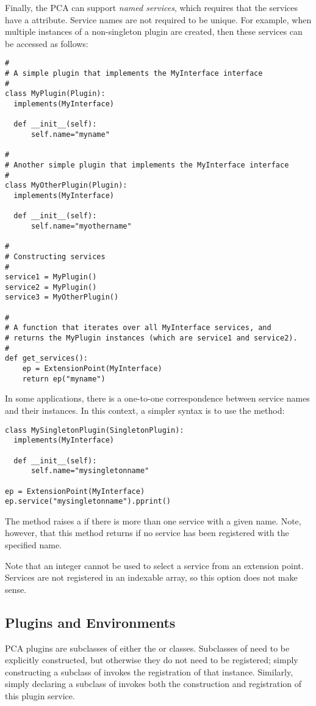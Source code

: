 Finally, the PCA can support \textit{named services}, which requires that
the services have a  attribute. Service names are not required
to be unique. For example, when multiple instances of a non-singleton
plugin are created, then these services can be accessed as follows:
\begin{lstlisting}
#
# A simple plugin that implements the MyInterface interface
#
class MyPlugin(Plugin):
  implements(MyInterface)

  def __init__(self):
      self.name="myname"

#
# Another simple plugin that implements the MyInterface interface
#
class MyOtherPlugin(Plugin):
  implements(MyInterface)

  def __init__(self):
      self.name="myothername"

#
# Constructing services
#
service1 = MyPlugin()
service2 = MyPlugin()
service3 = MyOtherPlugin()

#
# A function that iterates over all MyInterface services, and
# returns the MyPlugin instances (which are service1 and service2).
#
def get_services():
    ep = ExtensionPoint(MyInterface)
    return ep("myname")
\end{lstlisting}
In some applications, there is a one-to-one correspondence between service
names and their instances. In this context, a simpler syntax is to use
the  method:
\begin{lstlisting}
class MySingletonPlugin(SingletonPlugin):
  implements(MyInterface)

  def __init__(self):
      self.name="mysingletonname"

ep = ExtensionPoint(MyInterface)
ep.service("mysingletonname").pprint()
\end{lstlisting}
The  method raises a  if there is more than one service
with a given name. Note, however, that this method returns  if no
service has been registered with the specified name.

Note that an integer cannot be used to select a service from an extension
point. Services are not registered in an indexable array, so this option
does not make sense.


\subsection{Plugins and Environments}

PCA plugins are subclasses of either the  or 
classes. Subclasses of  need to be explicitly constructed,
but otherwise they do not need to be registered; simply constructing a
subclass of  invokes the registration of that instance. Similarly,
simply declaring a subclass of  invokes both the construction
and registration of this plugin service.

